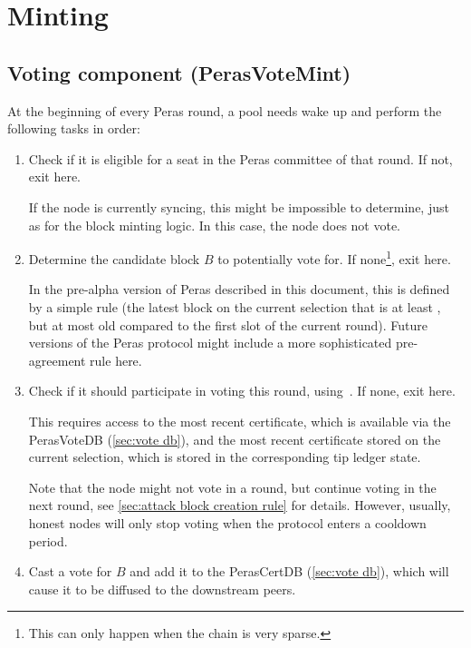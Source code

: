 \section{Minting}\label{sec:minting}

\subsection{Voting component (PerasVoteMint)}\label{sec:vote mint}

At the beginning of every Peras round, a pool needs wake up and perform the following tasks in order:
\begin{enumerate}
\item
  Check if it is eligible for a seat in the Peras committee of that round.
  If not, exit here.

  If the node is currently syncing, this might be impossible to determine, just as for the block minting logic.
  In this case, the node does not vote.
\item
  Determine the candidate block $B$ to potentially vote for.
  If none\footnote{This can only happen when the chain is very sparse.}, exit here.

  In the pre-alpha version of Peras described in this document, this is defined by a simple rule (the latest block on the current selection that is at least \perasBlockMinSlots{}, but at most \perasBlockMaxSlots{} old compared to the first slot of the current round).
  Future versions of the Peras protocol might include a more sophisticated pre-agreement rule here.
\item
  Check if it should participate in voting this round, using~\cite[Rules for voting in a round]{peras-cip}.
  If none, exit here.

  This requires access to the most recent certificate, which is available via the PerasVoteDB (\cref{sec:vote db}), and the most recent certificate stored on the current selection, which is stored in the corresponding tip ledger state.

  Note that the node might not vote in a round, but continue voting in the next round, see \cref{sec:attack block creation rule} for details.
  However, usually, honest nodes will only stop voting when the protocol enters a cooldown period.
\item
  Cast a vote for $B$ and add it to the PerasCertDB (\cref{sec:vote db}), which will cause it to be diffused to the downstream peers.
\end{enumerate}

